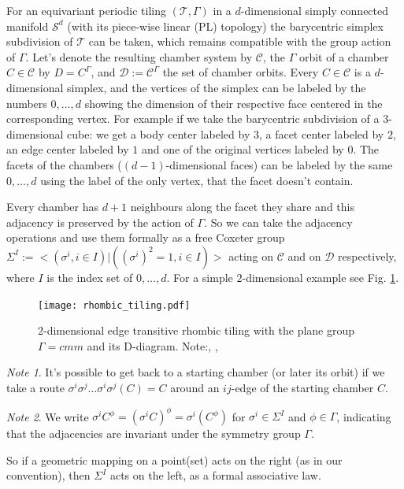\documentclass[12pt,a4paper]{article}
\numberwithin{equation}{section}
\theoremstyle{plain}%
\theoremstyle{definition}
\theoremstyle{remark}
\newtheorem*{note}{Note}
\begin{document}
For an equivariant periodic tiling $(\mathcal{T},\Gamma)$ in a $d$-dimensional
simply connected manifold $\mathcal{S}^d$ (with its piece-wise linear (PL)
topology) the barycentric simplex subdivision of $\mathcal{T}$ can be taken,
which remains compatible with the group action of $\Gamma$. Let's denote the
resulting chamber system by $\mathcal{C}$, the $\Gamma$ orbit of a chamber $C\in
\mathcal{C}$ by $D=C^\Gamma$, and $\mathcal{D}:= \mathcal{C}^\Gamma$ the set of
chamber orbits. Every $C\in \mathcal{C}$ is a $d$-dimensional simplex, and the
vertices of the simplex can be labeled by the numbers $0,\ldots,d$ showing the
dimension of their respective face centered in the corresponding vertex. For
example if we take the barycentric subdivision of a $3$-dimensional cube: we get
a body center labeled by $3$, a facet center labeled by $2$, an edge center
labeled by $1$ and one of the original vertices labeled by $0$. The facets of
the chambers ($(d-1)$-dimensional faces) can be labeled by the same $0,\ldots,d$
using the label of the only vertex, that the facet doesn't contain.

Every chamber has $d+1$ neighbours along the facet they share and this adjacency is
preserved by the action of $\Gamma$. So we can take the adjacency operations and
use them formally as a free Coxeter group $\Sigma^I := <(\sigma^i, i\in I) |
((\sigma^i)^2=1, i\in I)>$ acting on $\mathcal{C}$ and on $\mathcal{D}$
respectively, where $I$ is the index set of $0,\ldots,d$. For a simple
$2$-dimensional example see Fig. \ref{fig:rhombic_tiling}.

\begin{figure}
  \caption{\label{fig:rhombic_tiling} $2$-dimensional edge transitive rhombic
  tiling with the plane group $\Gamma=cmm$ \cite{VS93} and its D-diagram.
  Note:\usebox{\LegendVertex}, \usebox{\LegendEdge}, \usebox{\LegendFace}}
  \center
  \texttt{[image: rhombic\_tiling.pdf]}
\end{figure}

\begin{note}
  It's possible to get back to a starting chamber (or later its orbit) if we
  take a route $\sigma^i\sigma^j\ldots\sigma^i\sigma^j(C) = C$ around an
  $ij$-edge of the starting chamber $C$.
\end{note}

\begin{note}
  We write $\sigma^iC^\phi=(\sigma^iC)^\phi=\sigma^i(C^\phi)$ for
  $\sigma^i\in\Sigma^I$ and $\phi\in\Gamma$, indicating that the adjacencies are
  invariant under the symmetry group $\Gamma$.
  
  So if a geometric mapping on a point(set) acts on the right (as in our
  convention), then $\Sigma^I$ acts on the left, as a formal associative
  law.
\end{note}
\end{document}
